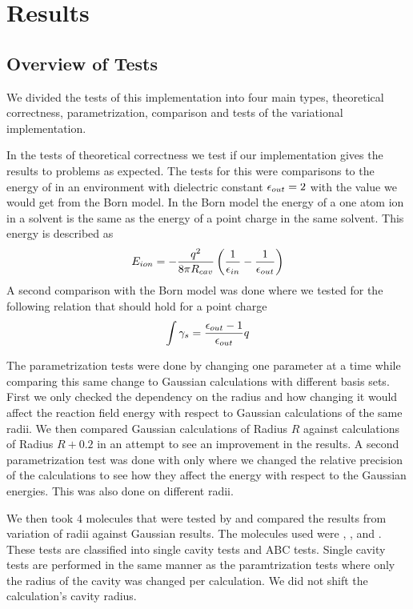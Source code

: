 \documentclass[../master_thesis.tex]{subfiles}
\begin{document}
\chapter{Results}\label{chap:Results}
\section{Overview of Tests}
We divided the tests of this implementation into four main types, theoretical
correctness, parametrization, comparison and tests of the variational implementation.

In the tests of theoretical correctness we test if our implementation gives the
results to problems as expected. The tests for this were comparisons to
the energy of   in an environment with dielectric constant $\epsilon_{out} = 2$
with the value we would get from the Born model. In the Born model the energy of a  %
one atom ion in a solvent is the same as the energy of a point charge in the same solvent.
This energy is described as
\begin{equation}
  E_{ion} = -\frac{q^{2}}{8 \pi R_{cav}}\left(\frac{1}{\epsilon_{in}\\}-\frac{1}{\epsilon_{out}}\right)
\end{equation}
A second comparison with the Born model was done where we tested for the
following relation that should hold for a point charge
\begin{equation}
  \int \gamma_s = \frac{\epsilon_{out} - 1}{\epsilon_{out}} q
\end{equation}

The parametrization tests were done by changing one parameter at a time while
comparing this same change to Gaussian calculations with different basis sets.
First we only checked the dependency on the radius and how changing it would
affect the reaction field energy with respect to Gaussian calculations of the same
radii. We then compared Gaussian calculations of Radius $R$ against \mrchem
calculations of Radius $R+0.2$ in an attempt to see an improvement in the
results.
A second parametrization test was done with only 
where we changed the relative precision of the \mrchem calculations to see how
they affect the energy with respect to the Gaussian energies. This was also done
on different radii.

We then took 4 molecules that were tested by \cite{Chipman2002} and compared the
results from variation of radii against Gaussian results. The molecules used
were , ,  and . These tests are classified into
single cavity tests and \ac{ABC} tests. Single cavity tests are performed in the
same manner as the paramtrization tests where only the radius of the cavity was changed per
calculation. We did not shift the \mrchem calculation's cavity radius.
\end{document}
